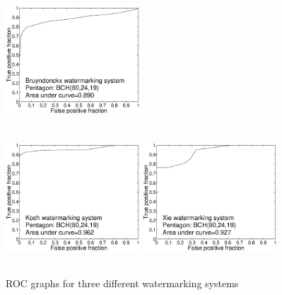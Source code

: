 \documentclass[12pt]{report}
\begin{document}
\begin{figure}[htb]
	\begin{center}
		\includegraphics[height=5cm,width=5cm]{BKX_EPS_formattedBetter/ROCgraphs/Pentagon80_24_19bruynROC.eps} \\ 
		\includegraphics[height=5cm,width=5cm]{BKX_EPS_formattedBetter/ROCgraphs/Pentagon80_24_19kochROC.eps}  
		\includegraphics[height=5cm,width=5cm]{BKX_EPS_formattedBetter/ROCgraphs/Pentagon80_24_19xieROC.eps}  
		\caption{ROC graphs for three different watermarking systems}
		\label{fig:roc3}
	\end{center}
\end{figure}
\end{document}
